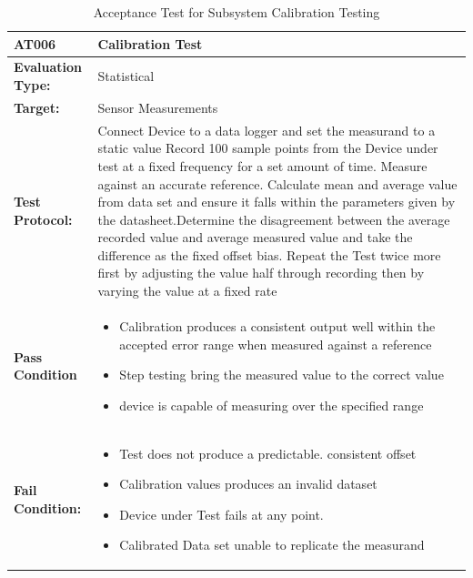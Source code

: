 \begin{table}[H]
	\centering
	\caption{Acceptance Test for Subsystem Calibration Testing}
	\begin{tabular}{|m{}|m{}|}
		\hline
		
		\textbf{AT006 }& \textbf{Calibration Test} \\
		\hline
		\textbf{Evaluation Type:} & Statistical \\
		\hline
		\textbf{Target: } & Sensor Measurements \\
		\hline
		\textbf{Test Protocol:} & Connect Device to a data logger and set the measurand to a static value Record 100 sample points from the Device under test at a fixed frequency for a set amount of time. Measure against an accurate reference. Calculate mean and average value from data set and ensure it falls within the parameters given by the datasheet.Determine the disagreement between the average recorded value and average measured value and take the difference as the fixed offset bias. Repeat the Test twice more first by adjusting the value half through recording then by varying the value at a fixed rate \\
		\hline
		\textbf{Pass Condition} & \vspace{5pt} \begin{itemize}
			\item Calibration produces a consistent output well within the accepted error range when measured against a reference
			\item Step testing bring the measured value to the correct value
			\item device is capable of measuring over the specified range
		\end{itemize}\\
		\hline
		\textbf{Fail Condition:} & \vspace{5pt} \begin{itemize}
			\item  Test does not produce a predictable. consistent offset
			\item  Calibration values produces an invalid dataset
			\item Device under Test fails at any point.
			\item Calibrated Data set unable to replicate the measurand
		\end{itemize}\\
		\hline
	\end{tabular}
	
	\label{tab:AT006}
\end{table}

